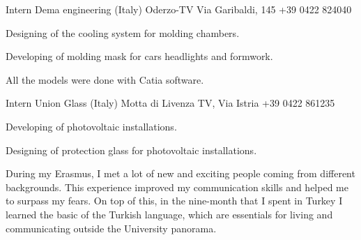 \documentclass[english,a4paper]{europasscv}
\begin{document}
\begin{europasscv}
		 {
			Intern
		}
		\ecvitem{} {
			Dema engineering (Italy) Oderzo-TV Via Garibaldi,
			145 \newline +39 0422 824040
			\newline {}
		}
		\ecvitem{} {
			\begin{ecvitemize}
				\item Designing of the cooling system for molding chambers.
				\item Developing of molding mask for cars headlights and formwork.
				\item All the models were done with Catia software.
			\end{ecvitemize}
		}

		 {
			Intern
		}
		\ecvitem{} {
			Union Glass (Italy) Motta di Livenza TV, Via Istria
			\newline +39 0422 861235
			\newline {}
		}
		\ecvitem{} {
			\begin{ecvitemize}
				\item Developing of photovoltaic installations.
				\item Designing of protection glass for photovoltaic installations.
			\end{ecvitemize}
		}



		\ecvlanguageheader
		\ecvlanguagefooter

		 {
			\begin{ecvitemize}
				\item During my Erasmus, I met a lot of new and exciting people
					coming from different backgrounds. This experience improved
					my communication skills and helped me to surpass my fears.
					On top of this, in the nine-month that I spent in Turkey
					I learned the basic of the Turkish language, which are
					essentials for living and communicating outside the
					University panorama.
			\end{ecvitemize}
		}


\end{europasscv}
\end{document}
